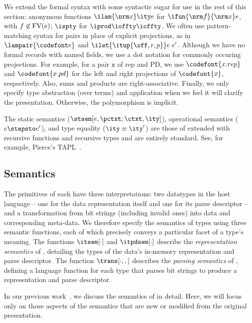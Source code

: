 We extend the formal syntax with some syntactic sugar for use in the
rest of this section: anonymous functions $\ilam {\nrm x} \ity e$ for
$\ifun {\nrm f} {\nrm x} e$, with $f \not\in {\rm FV}(e)$; $\ispty$
for $\iprod \ioffty \ioffty$.  We often use pattern-matching syntax
for pairs in place of explicit projections, as in $\lampair{\codefont
  e}$ and $\ilet {\itup{\off,r,p}} e\; e'$.  Although we have no
formal records with named fields, we use a dot notation for commonly
occuring projections. For example, for a pair $\mathtt x$ of rep and
PD, we use $\codefont{x.rep}$ and $\codefont{x.pd}$ for the left and
right projections of $\codefont{x}$, respectively. Also, sums and
products are right-associative.  Finally, we only specify type
abstraction (over terms) and application when we feel it will clarify
the presentation. Otherwise, the polymorphism is implicit.

The static semantics ($\stsem[e,{\pctxt;\ctxt},\ity]$), operational
semantics ($e \stepsto e'$), and type equality ($\ity \equiv \ity'$) are those of \fomega extended with
recursive functions and recursive types and are entirely standard.
See, for example, Pierce's TAPL~\cite{pierce:tapl}.

\subsection{\ddc{} Semantics}
\label{sec:ddc-sem}

The primitives of \ddc{} each have three interpretations: two
datatypes in the host language -- one for the data representation
itself and one for its parse descriptor -- and a transformation from
bit strings (including invalid ones) into data and corresponding
meta-data.  We therefore specify the semantics of \ddc{} types using three semantic
functions, each of which precisely conveys a particular facet of a
type's meaning.  The functions $\itsem[\cdot]$ and $\itpdsem[\cdot]$
describe the {\it representation semantics} of \ddc{}, detailing the
types of the data's in-memory representation and parse descriptor. The
function $\trans[\cdot,,]$ describes the {\it parsing semantics} of
\ddc{}, defining a \implang{} language function for each type that
parses bit strings to produce a representation and parse descriptor.

In our previous work~\cite{fisher+:next700ddl}, we discuss the
semantics of \ddcold{} in detail. Here, we will focus only on those
aspects of the semantics that are new or modified from the original
presentation.

